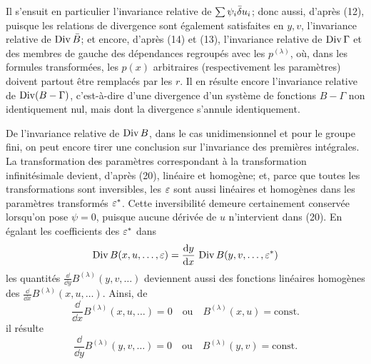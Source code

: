 Il s'ensuit en particulier l'invariance relative de \(\sum\psi_i\bar{\delta} u_i\); donc aussi, d'après (12), puisque les relations de divergence sont également satisfaites en \(y,v\), l'invariance relative de \(\operatorname{Div}\bar B\); et encore, d'après (14) et (13), l'invariance relative de \(\operatorname{Div}\Gamma\) et des membres de gauche des dépendances regroupés avec les \(p^{(\lambda)}\), où, dans les formules transformées, les \(p(x)\) arbitraires (respectivement les paramètres) doivent partout être remplacés par les \(r\). Il en résulte encore l'invariance relative de \(\operatorname{Div}(B-\Gamma)\), c'est-à-dire d'une divergence d'un système de fonctions \(B-\Gamma\) non identiquement nul, mais dont la divergence s'annule identiquement.

De l'invariance relative de \(\operatorname{Div} B\), dans le cas unidimensionnel et pour le groupe fini, on peut encore tirer une conclusion sur l'invariance des premières intégrales. La transformation des paramètres correspondant à la transformation infinitésimale devient, d'après (20), linéaire et homogène; et, parce que toutes les transformations sont inversibles, les \(\varepsilon\) sont aussi linéaires et homogènes dans les paramètres transformés \(\varepsilon^*\). Cette inversibilité demeure certainement conservée lorsqu'on pose \(\psi=0\), puisque aucune dérivée de \(u\) n'intervient dans (20). En égalant les coefficients des \(\varepsilon^*\) dans
\[
\operatorname{Div} B(x,u,\ldots,\varepsilon)=\frac{\mathrm d y}{\mathrm d x}\,\operatorname{Div} B(y,v,\ldots,\varepsilon^*)
\]
les quantités \(\frac{\dd}{\dd y}B^{(\lambda)}(y,v,\ldots)\) deviennent aussi des fonctions linéaires homogènes des \(\frac{\dd}{\dd x}B^{(\lambda)}(x,u,\ldots)\). Ainsi, de
\[
\frac{\dd}{\dd x}B^{(\lambda)}(x,u,\ldots)=0
\quad\text{ou}\quad B^{(\lambda)}(x,u)=\mathrm{const.}
\]
il résulte
\[
\frac{\dd}{\dd y}B^{(\lambda)}(y,v,\ldots)=0
\quad\text{ou}\quad B^{(\lambda)}(y,v)=\mathrm{const.}
\]
